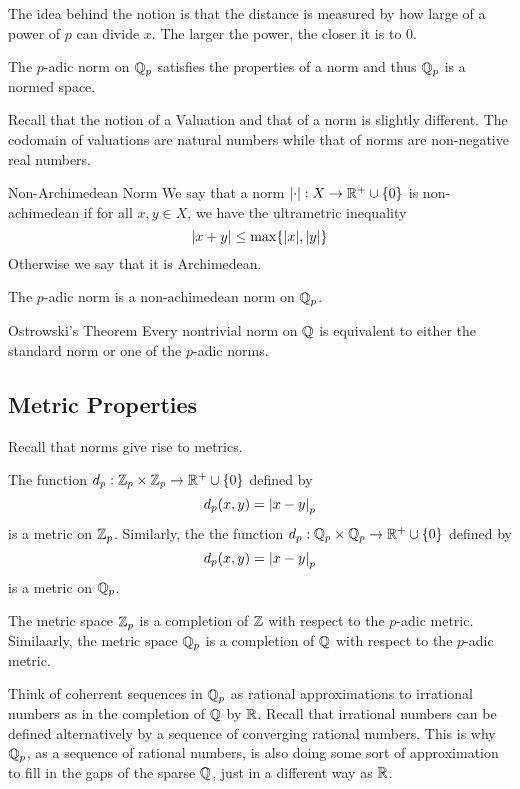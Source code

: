 \documentclass[a4paper]{article}
\begin{document}
The idea behind the notion is that the distance is measured by how large of a power of $p$ can divide $x$. The larger the power, the closer it is to $0$. 

\begin{prp}{}{} The $p$-adic norm on $\mathbb{Q}_p$ satisfies the properties of a norm and thus $\mathbb{Q}_p$ is a normed space. 
\end{prp}

Recall that the notion of a Valuation and that of a norm is slightly different. The codomain of valuations are natural numbers while that of norms are non-negative real numbers. 

\begin{defn}{Non-Archimedean Norm}{} We say that a norm $\abs{\cdot}:X\to\mathbb{R}^+\cup\{0\}$ is non-achimedean if for all $x,y\in X$, we have the ultrametric inequality $$\abs{x+y}\leq\max\{\abs{x},\abs{y}\}$$ Otherwise we say that it is Archimedean. 
\end{defn}

\begin{lmm}{}{} The $p$-adic norm is a non-achimedean norm on $\mathbb{Q}_p$. 
\end{lmm}

\begin{thm}{Ostrowski's Theorem}{} Every nontrivial norm on $\mathbb{Q}$ is equivalent to either the standard norm or one of the $p$-adic norms. 
\end{thm}

\subsection{Metric Properties}
Recall that norms give rise to metrics. 

\begin{prp}{}{} The function $d_p:\mathbb{Z}_p\times\mathbb{Z}_p\to\mathbb{R}^+\cup\{0\}$ defined by $$d_p(x,y)=\abs{x-y}_p$$ is a metric on $\mathbb{Z}_p$. Similarly, the the function $d_p:\mathbb{Q}_p\times\mathbb{Q}_p\to\mathbb{R}^+\cup\{0\}$ defined by $$d_p(x,y)=\abs{x-y}_p$$ is a metric on $\mathbb{Q}_p$. 
\end{prp}

\begin{prp}{}{} The metric space $\mathbb{Z}_p$ is a completion of $\mathbb{Z}$ with respect to the $p$-adic metric. Similaarly, the metric space $\mathbb{Q}_p$ is a completion of $\mathbb{Q}$ with respect to the $p$-adic metric. 
\end{prp}

Think of coherrent sequences in $\mathbb{Q}_p$ as rational approximations to irrational numbers as in the completion of $\mathbb{Q}$ by $\mathbb{R}$. Recall that irrational numbers can be defined alternatively by a sequence of converging rational numbers. This is why $\mathbb{Q}_p$, as a sequence of rational numbers, is also doing some sort of approximation to fill in the gaps of the sparse $\mathbb{Q}$, just in a different way as $\mathbb{R}$. 
\end{document}
